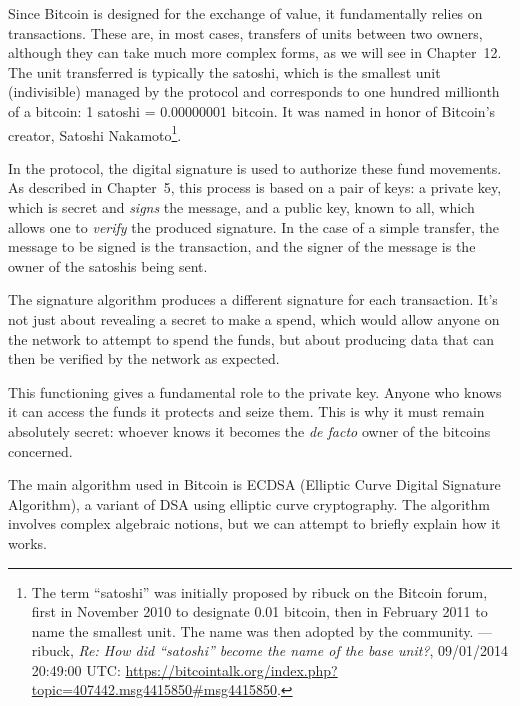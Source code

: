 \documentclass[
  a5paper,
  smalldemyvopaper,10pt,twoside,onecolumn,openright,extrafontsizes,hidelinks]{memoir}
\begin{document}
Since Bitcoin is designed for the exchange of value, it fundamentally
relies on transactions. These are, in most cases, transfers of units
between two owners, although they can take much more complex forms, as
we will see in Chapter~12. The unit transferred is typically the
satoshi, which is the smallest unit (indivisible) managed by the
protocol and corresponds to one hundred millionth of a bitcoin: 1
satoshi = 0.00000001 bitcoin. It was named in honor of Bitcoin's
creator, Satoshi Nakamoto\footnote{The term ``satoshi'' was initially
  proposed by ribuck on the Bitcoin forum, first in November 2010 to
  designate 0.01 bitcoin, then in February 2011 to name the smallest
  unit. The name was then adopted by the community. --- ribuck,
  \emph{Re: How did ``satoshi'' become the name of the base unit?},
  09/01/2014 20:49:00 UTC:
  \url{https://bitcointalk.org/index.php?topic=407442.msg4415850\#msg4415850}.}.

In the protocol, the digital signature is used to authorize these fund
movements. As described in Chapter~5, this process is based on a pair of
keys: a private key, which is secret and \emph{signs} the message, and a
public key, known to all, which allows one to \emph{verify} the produced
signature. In the case of a simple transfer, the message to be signed is
the transaction, and the signer of the message is the owner of the
satoshis being sent.

The signature algorithm produces a different signature for each
transaction. It's not just about revealing a secret to make a spend,
which would allow anyone on the network to attempt to spend the funds,
but about producing data that can then be verified by the network as
expected.

This functioning gives a fundamental role to the private key. Anyone who
knows it can access the funds it protects and seize them. This is why it
must remain absolutely secret: whoever knows it becomes the \emph{de
facto} owner of the bitcoins concerned.

The main algorithm used in Bitcoin is ECDSA (Elliptic Curve Digital
Signature Algorithm), a variant of DSA using elliptic curve
cryptography. The algorithm involves complex algebraic notions, but we
can attempt to briefly explain how it works.
\end{document}
